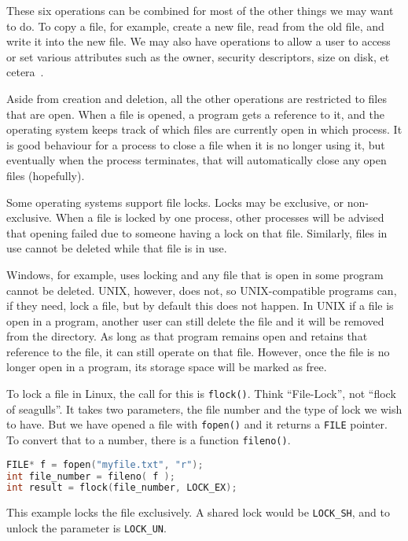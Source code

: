 These six operations can be combined for most of the other things we may want to do. To copy a file, for example, create a new file, read from the old file, and write it into the new file. We may also have operations to allow a user to access or set various attributes such as the owner, security descriptors, size on disk, et cetera~\cite{osc}.

Aside from creation and deletion, all the other operations are restricted to files that are open. When a file is opened, a program gets a reference to it, and the operating system keeps track of which files are currently open in which process. It is good behaviour for a process to close a file when it is no longer using it, but eventually when the process terminates, that will automatically close any open files (hopefully).

Some operating systems support file locks. Locks may be exclusive, or non-exclusive. When a file is locked by one process, other processes will be advised that opening failed due to someone having a lock on that file. Similarly, files in use cannot be deleted while that file is in use. 

Windows, for example, uses locking and any file that is open in some program cannot be deleted. UNIX, however, does not, so UNIX-compatible programs can, if they need, lock a file, but by default this does not happen. In UNIX if a file is open in a program, another user can still delete the file and it will be removed from the directory. As long as that program remains open and retains that reference to the file, it can still operate on that file. However, once the file is no longer open in a program, its storage space will be marked as free.

To lock a file in Linux, the call for this is \texttt{flock()}. Think ``File-Lock'', not ``flock of seagulls''. It takes two parameters, the file number and the type of lock we wish to have. But we have opened a file with \texttt{fopen()} and it returns a \texttt{FILE} pointer. To convert that to a number, there is a function \texttt{fileno()}. 

\begin{lstlisting}[language=C]
FILE* f = fopen("myfile.txt", "r");
int file_number = fileno( f );
int result = flock(file_number, LOCK_EX);
\end{lstlisting}

This example locks the file exclusively. A shared lock would be \texttt{LOCK\_SH}, and to unlock the parameter is \texttt{LOCK\_UN}. 

